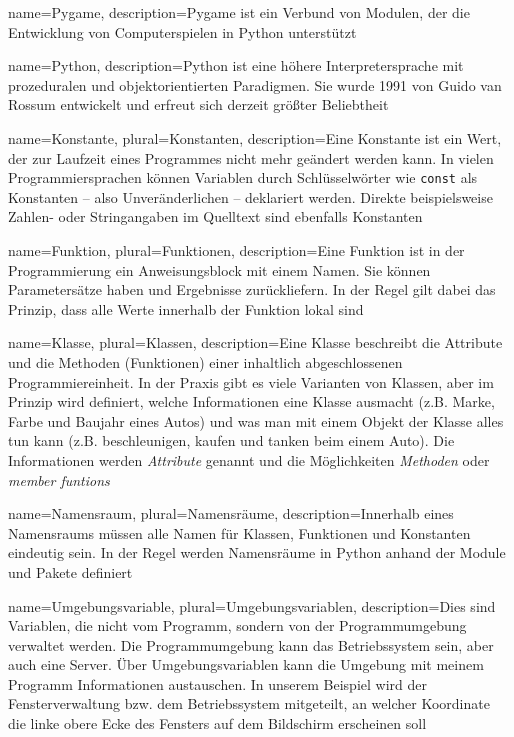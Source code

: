 {
  name={Pygame},
  description={Pygame ist ein Verbund von Modulen, der die Entwicklung von Computerspielen in Python unterstützt}
}

{
  name={Python},
  description={Python ist eine höhere Interpretersprache mit prozeduralen und objektorientierten Paradigmen. Sie wurde 1991 von Guido van Rossum entwickelt und erfreut sich derzeit größter Beliebtheit}
}

{
  name={Konstante},
  plural={Konstanten},
  description={Eine Konstante ist ein Wert, der zur Laufzeit eines Programmes nicht mehr geändert werden kann. In vielen Programmiersprachen können Variablen durch Schlüsselwörter wie \texttt{const} als Konstanten -- also Unveränderlichen -- deklariert werden. Direkte beispielsweise Zahlen- oder Stringangaben im Quelltext sind ebenfalls Konstanten}
}

{
  name={Funktion},
  plural={Funktionen},
  description={Eine Funktion ist in der Programmierung ein Anweisungsblock mit einem Namen. Sie können Parametersätze haben und Ergebnisse zurückliefern. In der Regel gilt dabei das Prinzip, dass alle Werte innerhalb der Funktion lokal sind}
}

{
  name={Klasse},
  plural={Klassen},
  description={Eine Klasse beschreibt die Attribute und die Methoden (Funktionen) einer inhaltlich abgeschlossenen Programmiereinheit. In der Praxis gibt es viele Varianten von Klassen, aber im Prinzip wird definiert, welche Informationen eine Klasse ausmacht (z.B. Marke, Farbe und Baujahr eines Autos) und was man mit einem Objekt der Klasse alles tun kann (z.B. beschleunigen, kaufen und tanken beim einem Auto). Die Informationen werden \emph{Attribute} genannt und die Möglichkeiten \emph{Methoden} oder \emph{member funtions}} 
}

{
  name={Namensraum},
  plural={Namensräume},
  description={Innerhalb eines Namensraums müssen alle Namen für Klassen, Funktionen und Konstanten eindeutig sein. In der Regel werden Namensräume in Python anhand der Module und Pakete definiert} 
}

{
  name={Umgebungsvariable},
  plural={Umgebungsvariablen},
  description={Dies sind Variablen, die nicht vom Programm, sondern von der Programmumgebung verwaltet werden. Die Programmumgebung kann das Betriebssystem sein, aber auch eine Server. Über Umgebungsvariablen kann die Umgebung mit meinem Programm Informationen austauschen. In unserem Beispiel wird der Fensterverwaltung bzw. dem Betriebssystem mitgeteilt, an welcher Koordinate die linke obere Ecke des Fensters auf dem Bildschirm erscheinen soll} 
}


